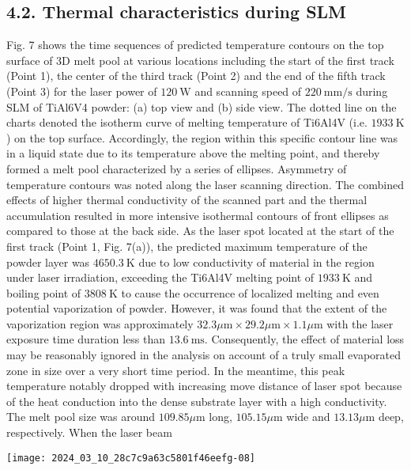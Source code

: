 \documentclass[10pt]{article}
\begin{document}
\subsection*{4.2. Thermal characteristics during SLM}
Fig. 7 shows the time sequences of predicted temperature contours on the top surface of 3D melt pool at various locations including the start of the first track (Point 1), the center of the third track (Point 2) and the end of the fifth track (Point 3) for the laser power of $120 \mathrm{~W}$ and scanning speed of $220 \mathrm{~mm} / \mathrm{s}$ during SLM of TiAl6V4 powder: (a) top view and (b) side view. The dotted line on the charts denoted the isotherm curve of melting temperature of Ti6Al4V (i.e. $1933 \mathrm{~K}$ ) on the top surface. Accordingly, the region within this specific contour line was in a liquid state due to its temperature above the melting point, and thereby formed a melt pool characterized by a series of ellipses. Asymmetry of temperature contours was noted along the laser scanning direction. The combined effects of higher thermal conductivity of the scanned part and the thermal accumulation resulted in more intensive isothermal contours of front ellipses as compared to those at the back side. As the laser spot located at the start of the first track (Point 1, Fig. 7(a)), the predicted maximum temperature of the powder layer was $4650.3 \mathrm{~K}$ due to low conductivity of material in the region under laser irradiation, exceeding the Ti6Al4V melting point of $1933 \mathrm{~K}$ and boiling point of $3808 \mathrm{~K}$ to cause the occurrence of localized melting and even potential vaporization of powder. However, it was found that the extent of the vaporization region was approximately $32.3 \mu \mathrm{m} \times 29.2 \mu \mathrm{m} \times 1.1 \mu \mathrm{m}$ with the laser exposure time duration less than $13.6 \mathrm{~ms}$. Consequently, the effect of material loss may be reasonably ignored in the analysis on account of a truly small evaporated zone in size over a very short time period. In the meantime, this peak temperature notably dropped with increasing move distance of laser spot because of the heat conduction into the dense substrate layer with a high conductivity. The melt pool size was around $109.85 \mu \mathrm{m}$ long, $105.15 \mu \mathrm{m}$ wide and $13.13 \mu \mathrm{m}$ deep, respectively. When the laser beam

\begin{center}
\texttt{[image: 2024\_03\_10\_28c7c9a63c5801f46eefg-08]}
\end{center}
\end{document}
